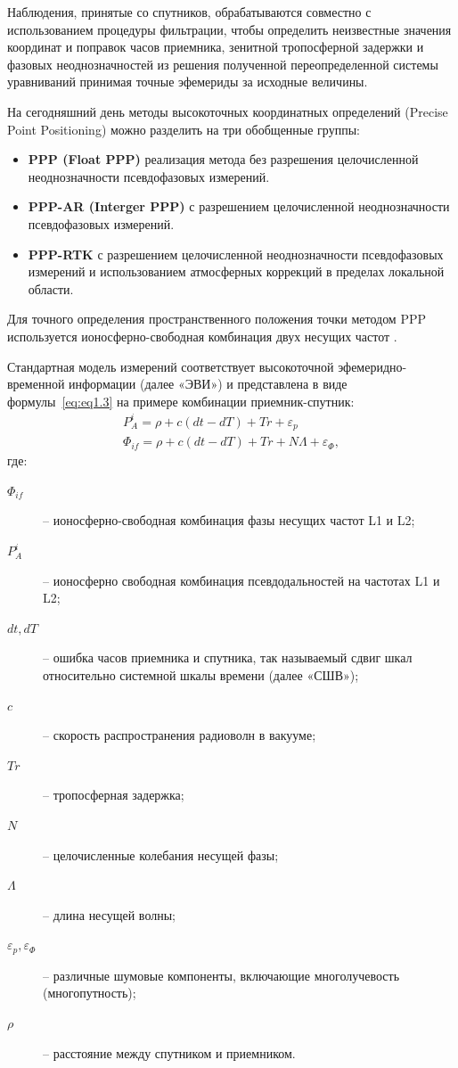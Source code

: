 Наблюдения, принятые со спутников, обрабатываются совместно с использованием процедуры фильтрации, чтобы определить неизвестные значения координат и поправок часов приемника, зенитной тропосферной задержки и фазовых неоднозначностей из решения полученной переопределенной системы уравниваний принимая точные эфемериды за исходные величины.

На сегодняшний день методы высокоточных координатных определений (Precise Point Positioning) можно разделить на три обобщенные группы:
\begin{itemize}
	\item \textbf{PPP (Float PPP)} реализация метода без разрешения целочисленной неоднозначности псевдофазовых измерений.
	\item \textbf{PPP-AR (Interger PPP)} с разрешением целочисленной неоднозначности псевдофазовых измерений.
	\item \textbf{PPP-RTK} с разрешением целочисленной неоднозначности псевдофазовых измерений и использованием атмосферных коррекций в пределах локальной области.
\end{itemize}

Для точного определения пространственного положения точки методом PPP используется ионосферно-свободная комбинация двух несущих частот \cite{src03,src05,src12,src19}. 

Стандартная модель измерений соответствует высокоточной эфемеридно-временной информации (далее «ЭВИ») и представлена в виде формулы~\cref{eq:eq1.3} на примере комбинации приемник-спутник:
\begin{equation}
	\label{eq:eq1.3}
	\begin{array}{l}
		P_{A}^{i}=\rho+c\left(dt-dT\right)+Tr+\varepsilon_{p}\\
		\varPhi_{if}=\rho+c\left(dt-dT\right)+Tr+N\varLambda+\varepsilon_{\Phi},
	\end{array}
\end{equation}
где: 
\begin{description}
	\item[$\varPhi_{if}$] -- ионосферно-свободная комбинация фазы несущих частот L1 и L2; 
	\item[$P_{A}^{i}$] -- ионосферно свободная комбинация псевдодальностей на частотах L1 и L2; 
	\item[$dt, dT$] -- ошибка часов приемника и спутника, так называемый сдвиг шкал относительно системной шкалы времени (далее «СШВ»);
	\item[$c$] -- скорость распространения радиоволн в вакууме;
	\item[$Tr$] -- тропосферная задержка;
	\item[$N$] -- целочисленные колебания несущей фазы;  
	\item[$\varLambda$] -- длина несущей волны;
	\item[$\varepsilon_{p}, \varepsilon_{\Phi}$] -- различные шумовые компоненты, включающие многолучевость (многопутность); 
	\item[$\rho$] -- расстояние между спутником и приемником.
\end{description}

